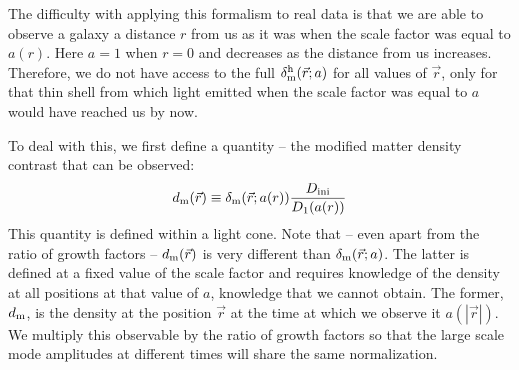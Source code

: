 \documentclass[prd,amsmath,amssymb,floatfix,superscriptaddress,nofootinbib,twocolumn]{revtex4-1}
\def\be{\begin{equation}}
\def\ee{\end{equation}}
\newcommand{\ini}{\rm ini}
\newcommand{\vrr}{\vec{r}}
\newcommand{\eql}[1]{\label{eq:#1}}
\newcommand{\peikai}[1]{{\color{blue} #1}}
\newcommand\dmh{\delta_{\rm m}^{\rm h}}
\begin{document}
The difficulty with applying this formalism to real data is that we are able to observe a galaxy a distance $r$ from us as it was when the scale factor was equal to $a(r)$. Here $a=1$ when $r=0$ and decreases as the distance from us increases. Therefore, we do not have access to the full $\dmh(\vec r; a)$ for all values of $\vec r$, only for that thin shell from which light emitted when the scale factor was equal to $a$ would have reached us by now.

\newcommand\dm{\delta_{\rm m}}
\newcommand\dlc{d_{\rm m}}
\newcommand\dmi{d_{\rm m,ini}}
\newcommand\dlch{d^{\rm h}_{\rm m}}
\newcommand\dolc{d^{ (1)}_{\rm m}}
\newcommand\dtlc{d^{ (2)}_{\rm m}}
To deal with this, we first define a quantity -- the modified matter density contrast that can be observed: 
\be
\dlc(\vrr) \equiv \dm(\vrr;a(r)) \frac{D_{\ini}}{D_{1}(a(r))} \eql{LC}
\ee
\peikai{This quantity is defined within a light cone.} Note that -- even apart from the ratio of growth factors -- $\dlc(\vrr)$ is very different than $\dm(\vrr; a)$. The latter is defined at a fixed value of the scale factor and requires knowledge of the density at all positions at that value of $a$, knowledge that we cannot obtain. The former, $\dlc$, is the density at the position $\vrr$ at the time at which we observe it $a(|\vrr|)$.
%
We multiply this observable by the ratio of growth factors so that the large scale mode amplitudes at different times will share the same normalization. 
\end{document}
